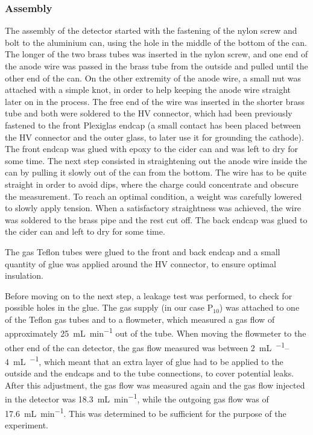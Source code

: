 \subsubsection{Assembly}

The assembly of the detector started with the fastening of the nylon screw and
bolt to the aluminium can, using the hole in the middle of the bottom of the
can. The longer of the two brass tubes was inserted in the nylon screw, and one
end of the anode wire was passed in the brass tube from the outside and pulled
until the other end of the can. On the other extremity of the anode wire, a
small nut was attached with a simple knot, in order to help keeping the anode
wire straight later on in the process. The free end of the wire was inserted in
the shorter brass tube and both were soldered to the HV connector, which
had been previously fastened to the front Plexiglas endcap (a small contact
has been placed between the HV connector and the outer glass, to later
use it for grounding the cathode). The front endcap was glued with epoxy to the
cider can and was left to dry for some time. The next step consisted in
straightening out the anode wire inside the can by pulling it slowly out of the
can from the bottom. The wire has to be quite straight in order to avoid dips,
where the charge could concentrate and obscure the measurement. To reach an
optimal condition, a weight was carefully lowered to slowly apply tension.
When a satisfactory straightness was achieved, the wire was soldered to the
brass pipe and the rest cut off. The back endcap was glued to the cider can and
left to dry for some time.

The gas Teflon tubes were glued to the front and back endcap and a small
quantity of glue was applied around the HV connector, to ensure optimal
insulation.

Before moving on to the next step, a leakage test was performed, to check for
possible holes in the glue. The gas supply (in our case $\mathrm{P}_{10}$) was
attached to one of the Teflon gas tubes and to a flowmeter, which measured a gas
flow of approximately \SI{25}{\milli\liter\per\minute} out of the tube. When
moving the flowmeter to the other end of the can detector, the gas flow measured
was between \SIrange{2}{4}{\milli\liter\per\min}, which meant that an extra layer
of glue had to be applied to the outside and the endcaps and to the tube
connections, to cover potential leaks. After this adjustment, the gas
flow was measured again and the gas flow injected in the detector was
\SI{18.3}{\milli\liter\per\minute}, while the outgoing gas flow was of
\SI{17.6}{\milli\liter\per\minute}. This was determined to be sufficient for the
purpose of the experiment.

